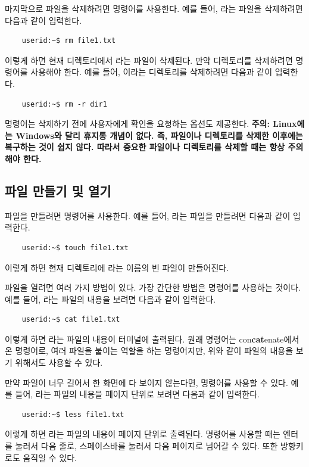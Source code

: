 {마지막으로 파일을 삭제하려면  명령어를 사용한다. 예를 들어, 라는 파일을 삭제하려면 다음과 같이 입력한다.
\begin{lstlisting}    
    userid:~$ rm file1.txt
\end{lstlisting}
이렇게 하면 현재 디렉토리에서 라는 파일이 삭제된다. 만약 디렉토리를 삭제하려면  명령어를 사용해야 한다. 예를 들어, 이라는 디렉토리를 삭제하려면 다음과 같이 입력한다.
\begin{lstlisting}
    userid:~$ rm -r dir1
\end{lstlisting}
 명령어는 삭제하기 전에 사용자에게 확인을 요청하는  옵션도 제공한다. 
\textbf{주의: Linux에는 Windows와 달리 휴지통 개념이 없다. 즉, 파일이나 디렉토리를 삭제한 이후에는 복구하는 것이 쉽지 않다. 따라서 중요한 파일이나 디렉토리를 삭제할 때는 항상 주의해야 한다.}

\subsection{파일 만들기 및 열기}
파일을 만들려면  명령어를 사용한다. 예를 들어, 라는 파일을 만들려면 다음과 같이 입력한다.
\begin{lstlisting}
    userid:~$ touch file1.txt
\end{lstlisting}
이렇게 하면 현재 디렉토리에 라는 이름의 빈 파일이 만들어진다.

파일을 열려면 여러 가지 방법이 있다. 가장 간단한 방법은  명령어를 사용하는 것이다. 예를 들어, 라는 파일의 내용을 보려면 다음과 같이 입력한다.
\begin{lstlisting}
    userid:~$ cat file1.txt
\end{lstlisting}
이렇게 하면 라는 파일의 내용이 터미널에 출력된다. 원래  명령어는 con\textbf{cat}enate에서 온 명령어로, 여러 파일을 붙이는 역할을 하는 명령어지만, 위와 같이 파일의 내용을 보기 위해서도 사용할 수 있다.

만약 파일이 너무 길어서 한 화면에 다 보이지 않는다면,  명령어를 사용할 수 있다. 예를 들어, 라는 파일의 내용을 페이지 단위로 보려면 다음과 같이 입력한다.
\begin{lstlisting}
    userid:~$ less file1.txt
\end{lstlisting}
이렇게 하면 라는 파일의 내용이 페이지 단위로 출력된다.  명령어를 사용할 때는 엔터를 눌러서 다음 줄로, 스페이스바를 눌러서 다음 페이지로 넘어갈 수 있다. 또한 방향키로도 움직일 수 있다.

}
